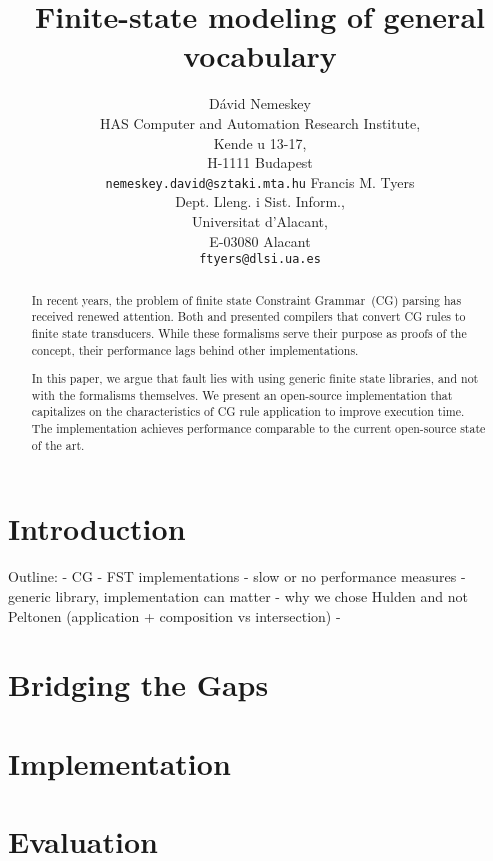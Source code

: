 \documentclass{article}
\title{Finite-state modeling of general vocabulary}
\author{D\'avid Nemeskey\\
 HAS Computer and Automation Research Institute, \\
   Kende u 13-17, \\
   H-1111 Budapest\\
 {\tt nemeskey.david@sztaki.mta.hu}
\And
Francis M. Tyers\\
Dept. Lleng. i Sist. Inform.,\\
Universitat d'Alacant,\\
E-03080 Alacant\\
{\tt ftyers@dlsi.ua.es}}
\date{}
\begin{document}
\maketitle\vspace*{-10mm}

\begin{abstract}
  In recent years, the problem of finite state Constraint Grammar~(CG) parsing has
  received renewed attention. Both  and
   presented compilers that convert CG rules to finite
  state transducers. While these formalisms serve their purpose as proofs of the
  concept, their performance lags behind other implementations.  %
  
  In this paper, we argue that fault lies with using generic finite state
  libraries, and not with the formalisms themselves. We present an open-source
  implementation that capitalizes on the characteristics of CG rule
  application to improve execution time. The implementation achieves performance
  comparable to the current open-source state of the art.
\end{abstract}

\section{Introduction}
Outline:
- CG
- FST implementations
- slow or no performance measures
- generic library, implementation can matter
- why we chose Hulden and not Peltonen (application + composition vs intersection)
- 

\section{Bridging the Gaps}
\label{sec:bridging}

\section{Implementation}
\label{sec:implementation}

\section{Evaluation}
\label{sec:evaluation}
\end{document}

